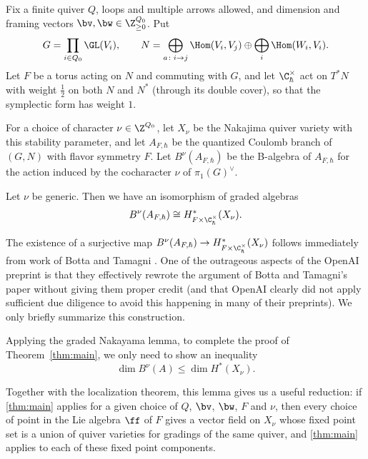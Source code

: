 \documentclass[11pt]{amsart}
\begin{document}

Fix a finite quiver $Q$, loops and multiple arrows allowed, and dimension
and framing vectors $\bv,\bw\in\Z_{\ge0}^{Q_0}$.  Put
\[
 G=\prod_{i\in Q_0}\GL(V_i),\qquad
 N=\bigoplus_{a\colon i\to j}\Hom(V_i,V_j)\oplus\bigoplus_i\Hom(W_i,V_i).
\]
Let $F$ be a torus acting on $N$ and commuting with $G$, and let
$\C^\times_\hbar$ act on $T^*N$ with weight $\frac12$ on both $N$ and $N^*$
(through its double cover), so that the symplectic form has weight $1$. 

For a choice of character $\nu\in\Z^{Q_0}$, let $X_\nu$ be the Nakajima quiver variety with this stability parameter, and let $A_{F,\hbar}$ be the quantized Coulomb branch of $(G,N)$ with flavor symmetry $F$.  Let $B^\nu(A_{F,\hbar})$ be the B-algebra of $A_{F,\hbar}$ for the action induced by the cocharacter $\nu$ of $\pi_1(G)^\vee$.
\begin{theorem}\label{thm:main}
Let $\nu$ be generic.  Then we have an isomorphism of graded algebras
\[B^\nu(A_{F,\hbar})\cong H^*_{F\times\C^\times_\hbar}(X_\nu).\]
\end{theorem}
The existence of a surjective map $B^\nu(A_{F,\hbar})\to H^*_{F\times\C^\times_\hbar}(X_\nu)$ follows immediately from work of Botta and Tamagni \cite{bottaQuasimapCritical2026}. One of the outrageous aspects of the OpenAI preprint is that they effectively rewrote the argument of Botta and Tamagni's paper without giving them proper credit (and that OpenAI clearly did not apply sufficient due diligence to avoid this happening in many of their preprints).  
We only briefly summarize this construction.

Applying the graded Nakayama lemma, to complete the proof of Theorem~\ref{thm:main}, we only need to show an inequality 
\[\dim B^\nu(A)\leq \dim H^*(X_\nu).\]

Together with the localization theorem, this lemma gives us a useful reduction: if \cref{thm:main} applies for a given choice of $Q$, $\bv$, $\bw$, $F$ and $\nu$, then every choice of point in the Lie algebra $\ff$ of $F$ gives a vector field on $X_\nu$ whose fixed point set is a union of quiver varieties for gradings of the same quiver, and \cref{thm:main} applies to each of these fixed point components.  
\end{document}
